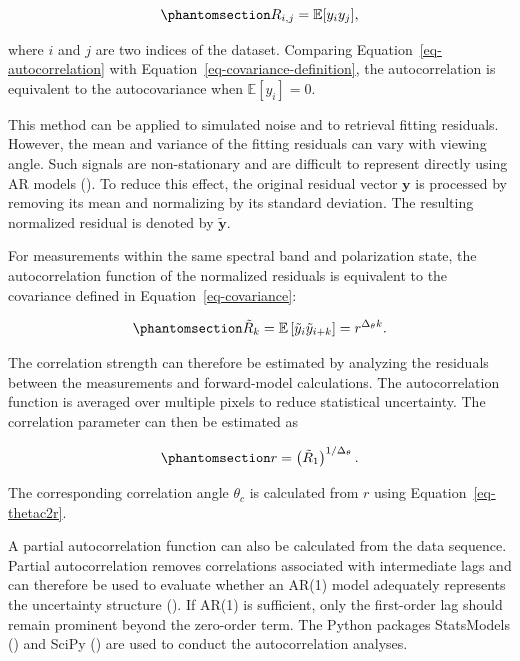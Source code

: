 \documentclass[
  11pt,
  letterpaper,
]{scrreprt}
\begin{document}
\begin{equation}\phantomsection\label{eq-autocorrelation}{
R_{i,j}
=
\mathbb{E}[y_i y_j],
}\end{equation}

where \(i\) and \(j\) are two indices of the dataset. Comparing
Equation~\ref{eq-autocorrelation} with
Equation~\ref{eq-covariance-definition}, the autocorrelation is
equivalent to the autocovariance when \(\mathbb{E}[y_i]=0\).

This method can be applied to simulated noise and to retrieval fitting
residuals. However, the mean and variance of the fitting residuals can
vary with viewing angle. Such signals are non-stationary and are
difficult to represent directly using AR models
(). To reduce this
effect, the original residual vector \(\mathbf{y}\) is processed by
removing its mean and normalizing by its standard deviation. The
resulting normalized residual is denoted by \(\tilde{\mathbf{y}}\).

For measurements within the same spectral band and polarization state,
the autocorrelation function of the normalized residuals is equivalent
to the covariance defined in Equation~\ref{eq-covariance}:

\begin{equation}\phantomsection\label{eq-rk}{
\tilde{R}_k
=
\mathbb{E}
\left[
\tilde{y}_i
\tilde{y}_{i+k}
\right]
=
r^{\Delta_\theta k}.
}\end{equation}

The correlation strength can therefore be estimated by analyzing the
residuals between the measurements and forward-model calculations. The
autocorrelation function is averaged over multiple pixels to reduce
statistical uncertainty. The correlation parameter can then be estimated
as

\begin{equation}\phantomsection\label{eq-r-from-ac}{
r
=
\left(\tilde{R}_1\right)^{1/\Delta_\theta}.
}\end{equation}

The corresponding correlation angle \(\theta_c\) is calculated from
\(r\) using Equation~\ref{eq-thetac2r}.

A partial autocorrelation function can also be calculated from the data
sequence. Partial autocorrelation removes correlations associated with
intermediate lags and can therefore be used to evaluate whether an AR(1)
model adequately represents the uncertainty structure
(). If AR(1) is
sufficient, only the first-order lag should remain prominent beyond the
zero-order term. The Python packages StatsModels
() and SciPy
() are used to
conduct the autocorrelation analyses.
\end{document}
